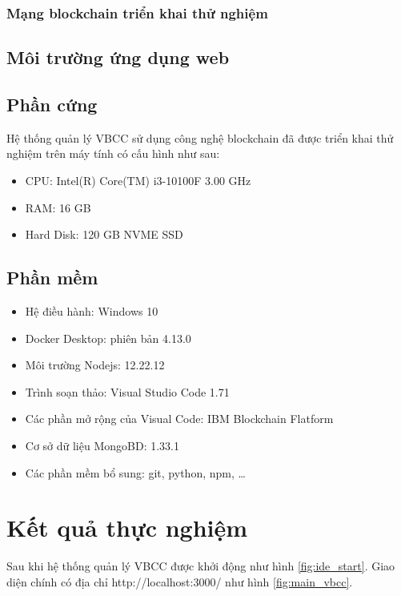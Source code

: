 \subsubsection{Mạng blockchain triển khai thử nghiệm}

\subsection{Môi trường ứng dụng web}

\subsection{Phần cứng}

Hệ thống quản lý VBCC sử dụng công nghệ blockchain đã được triển khai thử nghiệm trên máy tính có cấu hình như sau:
\begin{itemize}
\item CPU: Intel(R) Core(TM) i3-10100F 3.00 GHz
\item RAM: 16 GB
\item Hard Disk: 120 GB NVME SSD
\end{itemize}

\subsection{Phần mềm}
\begin{itemize}
\item Hệ điều hành: Windows 10
\item Docker Desktop: phiên bản 4.13.0
\item Môi trường Nodejs: 12.22.12
\item Trình soạn thảo: Visual Studio Code 1.71
\item Các phần mở rộng của Visual Code: IBM Blockchain Flatform
\item Cơ sở dữ liệu MongoBD: 1.33.1
\item Các phần mềm bổ sung: git, python, npm, \ldots
\end{itemize}

\section{Kết quả thực nghiệm}

Sau khi hệ thống quản lý VBCC được khởi động như hình \ref{fig:ide_start}. Giao diện chính có địa chỉ http://localhost:3000/ như hình \ref{fig:main_vbcc}. 

